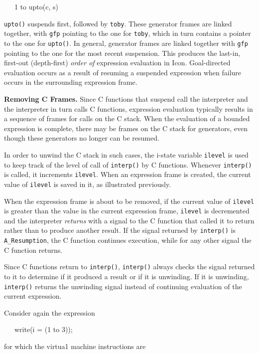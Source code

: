 {\ttfamily\mdseries
\ \ \ 1 to upto(c, s)}

\noindent \texttt{upto()} suspends first, followed by
\texttt{toby}. These generator frames are linked together, with
\texttt{gfp} pointing to the one for \texttt{toby}, which in turn
contains a pointer to the one for \texttt{upto()}. In general,
generator frames are linked together with \texttt{gfp} pointing to the
one for the most recent suspension. This produces the last-in,
first-out (depth-first) \textit{order of} expression evaluation in
Icon. Goal-directed evaluation occurs as a result of resuming
a suspended expression when failure occurs in the surrounding
expression frame.


\textbf{Removing C Frames.} Since C functions that suspend call the
interpreter and the interpreter in turn calls C functions, expression
evaluation typically results in a sequence of frames for calls on the
C stack. When the evaluation of a bounded expression is complete,
there may be frames on the C stack for generators, even though these
generators no longer can be resumed.

In order to {\textquotedbl}unwind{\textquotedbl} the C stack in such
cases, the i-state variable \texttt{ilevel} is used to keep track of
the level of call of \texttt{interp()} by C functions. Whenever
\texttt{interp()} is called, it increments \texttt{ilevel}. When an
expression frame is created, the current value of \texttt{ilevel} is
saved in it, as illustrated previously.

When the expression frame is about to be removed, if the current value
of \texttt{ilevel} is greater than the value in the current expression
frame, \texttt{ilevel} is decremented and the interpreter
\textit{returns }with a signal to the C function that called it to
return rather than to produce another result. If the signal returned
by \texttt{interp()} is \texttt{A\_Resumption}, the C function
continues execution, while for any other signal the C function
returns.

Since C functions return to \texttt{interp()}, \texttt{interp()}
always checks the signal returned to it to determine if it produced a
result or if it is unwinding. If it is unwinding, \texttt{interp()}
returns the unwinding signal instead of continuing evaluation
of\textit{ }the current expression.

Consider again the expression

{\ttfamily\mdseries
\ \ \ write(i = (1 to 3));}

\noindent for which the virtua1 machine instructions are

